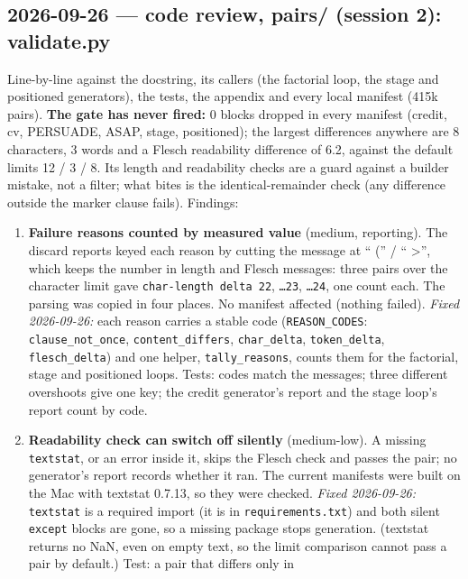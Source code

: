 \documentclass{article}
\begin{document}
\subsection*{2026-09-26 --- code review, pairs/ (session 2): validate.py}
Line-by-line against the docstring, its callers (the factorial loop, the stage and positioned generators), the
tests, the appendix and every local manifest (415k pairs). \textbf{The gate has never fired:} 0 blocks dropped in
every manifest (credit, cv, PERSUADE, ASAP, stage, positioned); the largest differences anywhere are 8 characters,
3 words and a Flesch readability difference of 6.2, against the default limits 12 / 3 / 8. Its length and
readability checks are a guard against a builder mistake, not a filter; what bites is the identical-remainder
check (any difference outside the marker clause fails). Findings:
\begin{enumerate}
  \item \textbf{Failure reasons counted by measured value} (medium, reporting). The discard reports keyed each
        reason by cutting the message at `` ('' / `` >'', which keeps the number in length and Flesch messages:
        three pairs over the character limit gave \texttt{char-length delta 22}, \texttt{\dots 23},
        \texttt{\dots 24}, one count each. The parsing was copied in four places. No manifest affected (nothing
        failed). \emph{Fixed 2026-09-26:} each reason carries a stable code (\texttt{REASON\_CODES}:
        \texttt{clause\_not\_once}, \texttt{content\_differs}, \texttt{char\_delta}, \texttt{token\_delta},
        \texttt{flesch\_delta}) and one helper, \texttt{tally\_reasons}, counts them for the factorial, stage and
        positioned loops. Tests: codes match the messages; three different overshoots give one key; the credit
        generator's report and the stage loop's report count by code.
  \item \textbf{Readability check can switch off silently} (medium-low). A missing \texttt{textstat}, or an error
        inside it, skips the Flesch check and passes the pair; no generator's report records whether it ran. The
        current manifests were built on the Mac with textstat 0.7.13, so they were checked. \emph{Fixed
        2026-09-26:} \texttt{textstat} is a required import (it is in \texttt{requirements.txt}) and both silent
        \texttt{except} blocks are gone, so a missing package stops generation. (textstat returns no NaN, even on
        empty text, so the limit comparison cannot pass a pair by default.) Test: a pair that differs only in

\end{enumerate}
\end{document}
